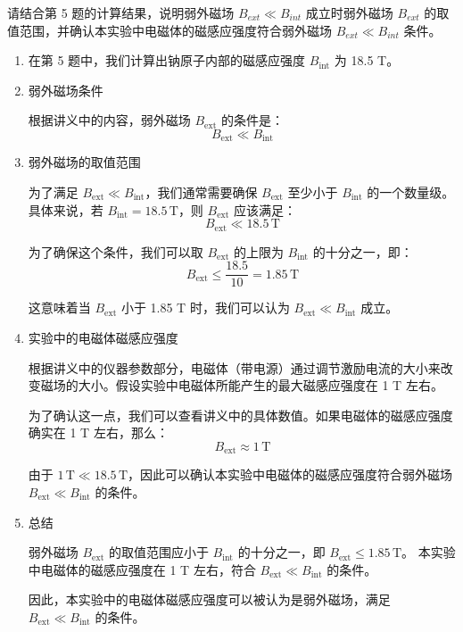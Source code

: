 \documentclass[dvipsnames, svgnames,a4paper,11pt]{article}
\begin{document}
	
	\begin{question}
		请结合第 5 题的计算结果，说明弱外磁场 $B_{ext} \ll B_{int}$ 成立时弱外磁场 $B_{ext}$ 的取值范围，并确认本实验中电磁体的磁感应强度符合弱外磁场 $B_{ext} \ll B_{int}$ 条件。
	\end{question}
	\begin{enumerate}
		\item 在第 5 题中，我们计算出钠原子内部的磁感应强度 \( B_{\text{int}} \) 为 18.5 T。
		
		\item 弱外磁场条件
		
		根据讲义中的内容，弱外磁场 \( B_{\text{ext}} \) 的条件是：
		\[ B_{\text{ext}} \ll B_{\text{int}} \]
		
		\item 弱外磁场的取值范围
		
		为了满足 \( B_{\text{ext}} \ll B_{\text{int}} \)，我们通常需要确保 \( B_{\text{ext}} \) 至少小于 \( B_{\text{int}} \) 的一个数量级。具体来说，若 \( B_{\text{int}} = 18.5 \, \text{T} \)，则 \( B_{\text{ext}} \) 应该满足：
		\[ B_{\text{ext}} \ll 18.5 \, \text{T} \]
		
		为了确保这个条件，我们可以取 \( B_{\text{ext}} \) 的上限为 \( B_{\text{int}} \) 的十分之一，即：
		\[ B_{\text{ext}} \leq \frac{18.5}{10} = 1.85 \, \text{T} \]
		
		这意味着当 \( B_{\text{ext}} \) 小于 1.85 T 时，我们可以认为 \( B_{\text{ext}} \ll B_{\text{int}} \) 成立。
		
		\item 实验中的电磁体磁感应强度
		
		根据讲义中的仪器参数部分，电磁体（带电源）通过调节激励电流的大小来改变磁场的大小。假设实验中电磁体所能产生的最大磁感应强度在 1 T 左右。
		
		为了确认这一点，我们可以查看讲义中的具体数值。如果电磁体的磁感应强度确实在 1 T 左右，那么：
		\[ B_{\text{ext}} \approx 1 \, \text{T} \]
		
		由于 \( 1 \, \text{T} \ll 18.5 \, \text{T} \)，因此可以确认本实验中电磁体的磁感应强度符合弱外磁场 \( B_{\text{ext}} \ll B_{\text{int}} \) 的条件。
		
		\item 总结
		
		弱外磁场 \( B_{\text{ext}} \) 的取值范围应小于 \( B_{\text{int}} \) 的十分之一，即 \( B_{\text{ext}} \leq 1.85 \, \text{T} \)。
		本实验中电磁体的磁感应强度在 1 T 左右，符合 \( B_{\text{ext}} \ll B_{\text{int}} \) 的条件。
		
		因此，本实验中的电磁体磁感应强度可以被认为是弱外磁场，满足 \( B_{\text{ext}} \ll B_{\text{int}} \) 的条件。
	\end{enumerate}
	
\end{document}
